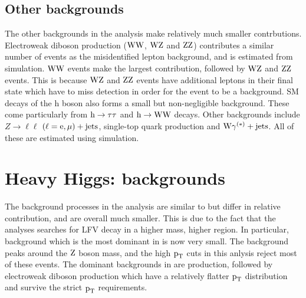\subsection{Other backgrounds}
\label{h125_other_bg}
The other backgrounds in the analysis make relatively much smaller contrbutions. Electroweak diboson production ($\text{W}\text{W}$, $\text{W}\text{Z}$ and $\text{Z}\text{Z}$) contributes a similar number of events as the misidentified lepton background, and is estimated from simulation. $\text{W}\text{W}$ events make the largest contribution, followed by $\text{W}\text{Z}$ and $\text{Z}\text{Z}$ events. This is because $\text{W}\text{Z}$ and $\text{Z}\text{Z}$ events  have additional leptons in their final state which have to miss detection in order for the event to be a background. SM decays of the h boson also forms a small but non-negligible background. These come particularly from $\text{h} \to \tau\tau$  and $\text{h} \to \text{W}\text{W}$ decays. Other backgrounds include $Z\to\ell\ell$ $(\ell = \text{e}, \mu)+\text{jets}$, single-top quark production and $\text{W}\gamma^{(*)}+\text{jets}$. All of these are estimated using simulation.  

\section{Heavy Higgs: \Hmue backgrounds }
\label{H_bg_val}
The background processes in the \Hmue analysis are  similar  to \hmue but differ in relative contribution, and are overall much smaller. This is due to the fact that the \Hmue analyses searches for LFV decay in a higher mass, higher \pt region. In particular, \ztt background which is the most dominant in \hmue is now very small. The \ztt background peaks around the $\text{Z}$ boson mass, and the  high $\text{p}_\text{T}$ cuts in this anlysis reject most of these events. The dominant backgrounds in \Hmue are \ttb production, followed by electroweak diboson production which have a relatively flatter $\text{p}_\text{T}$ distribution and survive the strict $\text{p}_\text{T}$ requirements.

